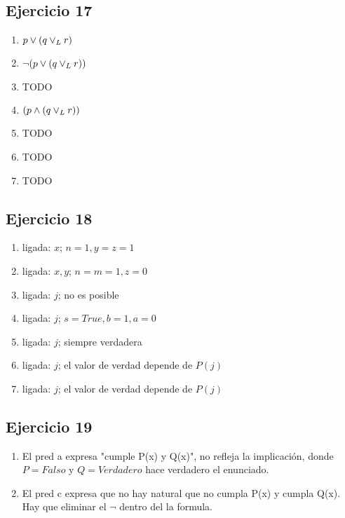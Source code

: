 \subsection{Ejercicio 17}
\begin{enumerate}[label=(\alph*)]
    \item $p \vee (q \lor _L r)$
    \item $\neg (p \vee (q \lor _L r))$
    \item TODO
    \item $(p \wedge (q \lor _L r))$
    \item TODO
    \item TODO
    \item TODO
\end{enumerate}

\subsection{Ejercicio 18}
\begin{enumerate}[label=(\alph*)]
    \item ligada: $x$; $n = 1, y = z = 1$
    \item ligada: $x, y$; $n = m = 1, z = 0$
    \item ligada: $j$; no es posible
    \item ligada: $j$; $s = True, b = 1, a = 0$
    \item ligada: $j$; siempre verdadera
    \item ligada: $j$; el valor de verdad depende de $P(j)$
    \item ligada: $j$; el valor de verdad depende de $P(j)$
\end{enumerate}

\subsection{Ejercicio 19}
\begin{enumerate}
    \item El pred a expresa "cumple P(x) y Q(x)", no refleja la implicación, donde $P = Falso$ y $Q = Verdadero$ hace verdadero el enunciado.
    \item El pred c expresa que no hay natural que no cumpla P(x) y cumpla Q(x). Hay que eliminar el $\neg$ dentro del la formula.
\end{enumerate}

